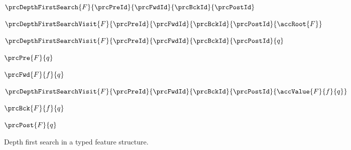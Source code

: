 \documentclass[11pt,a4paper,oneside,titlepage]{alb-corp}
\begin{document}
%
\begin{algorithm}
  $\prcDepthFirstSearch%
  {F}{\prcPreId}{\prcFwdId}{\prcBckId}{\prcPostId}$
  \begin{albAlgorithmic}
  \item \label{ln:alb-algorithms-documentation:depth-first-search-1} %

  \item \label{ln:alb-algorithms-documentation:depth-first-search-2} %
    $\prcDepthFirstSearchVisit%
    {F}{\prcPreId}{\prcFwdId}{\prcBckId}{\prcPostId}%
    {\accRoot{F}}$
  \end{albAlgorithmic}

  \medskip{}

  $\prcDepthFirstSearchVisit%
  {F}{\prcPreId}{\prcFwdId}{\prcBckId}{\prcPostId}{q}$
  \begin{albAlgorithmic}
  \item \label{ln:alb-algorithms-documentation:depth-first-search-3} %
    $\prcPre{F}{q}$

  \item \label{ln:alb-algorithms-documentation:depth-first-search-4} %

  \item \label{ln:alb-algorithms-documentation:depth-first-search-5} %

    \begin{albBlock}
    \item \label{ln:alb-algorithms-documentation:depth-first-search-6} %
      $\prcFwd{F}{f}{q}$

    \item \label{ln:alb-algorithms-documentation:depth-first-search-7} %

      \begin{albBlock}
      \item \label{ln:alb-algorithms-documentation:depth-first-search-8} %
        $\prcDepthFirstSearchVisit%
        {F}{\prcPreId}{\prcFwdId}{\prcBckId}{\prcPostId}%
        {\accValue{F}{f}{q}}$
      \end{albBlock}

    \item \label{ln:alb-algorithms-documentation:depth-first-search-9} %
      $\prcBck{F}{f}{q}$
    \end{albBlock}

  \item \label{ln:alb-algorithms-documentation:depth-first-search-10} %
    $\prcPost{F}{q}$
  \end{albAlgorithmic}
  \caption{Depth first search in a typed feature structure.}
  \label{alg:depth-first-search}
\end{algorithm}
%
\end{document}
